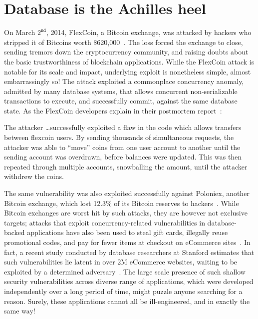 
\section*{Database is the Achilles heel}

On March $2^{\texttt{nd}}$, 2014, FlexCoin, a Bitcoin exchange, was
attacked by hackers who stripped it of Bitcoins worth
\$620,000~\cite{fcgrd, fcgizmodo}. The loss forced the exchange to
close, sending tremors down the cryptocurrency community, and raising
doubts about the basic trustworthiness of blockchain applications.
While the FlexCoin attack is notable for its scale and impact,
underlying exploit is nonetheless simple, almost embarrassingly so! The
attack exploited a commonplace concurrency anomaly, admitted by many
database systems, that allows concurrent non-serializable transactions
to execute, and successfully commit, against the same database state.
As the FlexCoin developers explain in their postmortem
report~\cite{fcwayback}:
\begin{displayquote}
The attacker \ldots successfully exploited a flaw in the code which
allows transfers between flexcoin users. By sending thousands of
simultaneous requests, the attacker was able to ``move'' coins from
one user account to another until the sending account was overdrawn,
before balances were updated. This was then repeated through multiple
accounts, snowballing the amount, until the attacker withdrew the
coins.
\end{displayquote}
The same vulnerability was also exploited successfully against
Poloniex, another Bitcoin exchange, which lost 12.3\% of its Bitcoin
reserves to hackers~\cite{poloniexbug}. While Bitcoin exchanges are
worst hit by such attacks, they are however not exclusive targets;
attacks that exploit concurrency-related vulnerabilities in
database-backed applications have also been used to steal gift cards,
illegally reuse promotional codes, and pay for fewer items at checkout
on eCommerce sites~\cite{tripwire, hackaday, shopify}.  In fact, a
recent study conducted by database researchers at Stanford estimates
that such vulnerabilities lie latent in over 2M eCommerce websites,
waiting to be exploited by a determined adversary~\cite{acidrain}. The
large scale presence of such shallow security vulnerabilities across
diverse range of applications, which were developed independently over
a long period of time, might puzzle anyone searching for a reason.
Surely, these applications cannot all be ill-engineered, and in
exactly the same way!  

